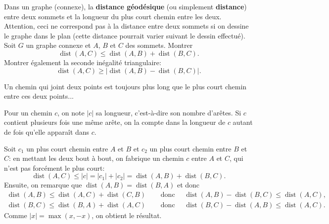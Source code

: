 \begin{exo} 
Dans un graphe (connexe), la \textbf{distance géodésique} (ou simplement \textbf{distance}) entre deux sommets et la longueur du plus court chemin entre les deux. Attention, ceci ne correspond pas à la distance entre deux sommets si on dessine le graphe dans le plan (cette distance pourrait varier suivant le dessin effectué).
Soit $G$ un graphe connexe et $A$, $B$ et $C$ des sommets. Montrer
\[ \operatorname{dist}(A,C)\leq \operatorname{dist}(A,B)+\operatorname{dist}(B,C).\]
Montrer également la \og seconde inégalité triangulaire\fg:
\[ \operatorname{dist}(A,C)\geq |\operatorname{dist}(A,B)-\operatorname{dist}(B,C)|.\]

\begin{hint}
Un chemin qui joint deux points est toujours plus long que le plus court chemin entre ces deux points...
\end{hint}

\begin{sol}
Pour un chemin $c$, on note $|c|$ sa longueur, c'est-à-dire son nombre d'arêtes. Si $c$ contient plusieurs fois une même arête, on la compte dans la longueur de $c$ autant de fois qu'elle apparaît dans $c$.

Soit $c_1$ un plus court chemin entre $A$ et $B$ et $c_2$ un plus court chemin entre $B$ et $C$: en mettant les deux bout à bout, on fabrique un chemin $c$ entre $A$ et $C$, qui n'est pas forcément le plus court:
$$\operatorname{dist}(A,C) \le |c|=|c_1|+|c_2|=\operatorname{dist}(A,B)+\operatorname{dist}(B,C).$$
Ensuite, on remarque que $\operatorname{dist}(A,B)=\operatorname{dist}(B,A)$ et donc
\begin{align*}
\operatorname{dist}(A,B) \le \operatorname{dist}(A,C)+\operatorname{dist}(C,B) & \quad \text{ donc } \quad \operatorname{dist}(A,B)-\operatorname{dist}(B,C) \le \operatorname{dist}(A,C), \\
\operatorname{dist}(B,C) \le \operatorname{dist}(B,A)+\operatorname{dist}(A,C) &  \quad \text{ donc }  \quad \operatorname{dist}(B,C)-\operatorname{dist}(A,B) \le \operatorname{dist}(A,C).
\end{align*}
Comme $|x|=\max(x,-x)$, on obtient le résultat.
\end{sol}
\end{exo}




